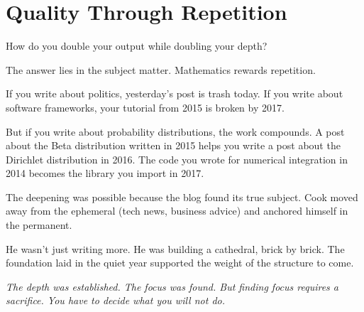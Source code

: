 \bigskip

\section*{Quality Through Repetition}

How do you double your output while doubling your depth?

The answer lies in the subject matter. Mathematics rewards repetition.


If you write about politics, yesterday's post is trash today. If you write about software frameworks, your tutorial from 2015 is broken by 2017.

But if you write about probability distributions, the work compounds. A post about the Beta distribution written in 2015 helps you write a post about the Dirichlet distribution in 2016. The code you wrote for numerical integration in 2014 becomes the library you import in 2017.

The deepening was possible because the blog found its true subject. Cook moved away from the ephemeral (tech news, business advice) and anchored himself in the permanent.

He wasn't just writing more. He was building a cathedral, brick by brick. The foundation laid in the quiet year supported the weight of the structure to come.

\bigskip

\textit{The depth was established. The focus was found. But finding focus requires a sacrifice. You have to decide what you will not do.}
